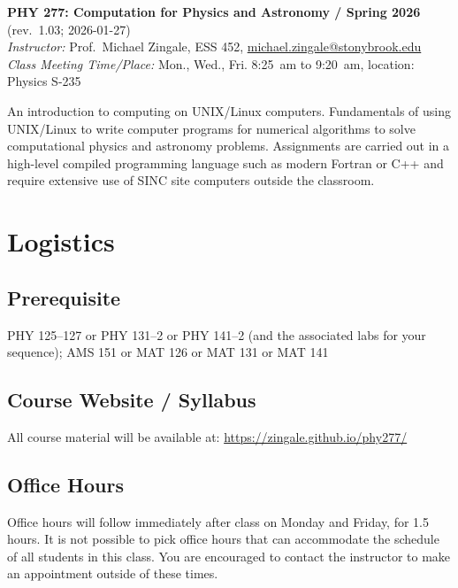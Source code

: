 \documentclass[10pt]{article}
\begin{document}
\begin{center}
{\large \sffamily \bfseries PHY 277: Computation for Physics and Astronomy / Spring 2026} {\footnotesize (rev.\ 1.03; 2026-01-27)}\\[1.5mm]
{\em Instructor:} Prof.\ Michael Zingale, ESS 452, \href{mailto:michael.zingale@stonybrook.edu}{michael.zingale@stonybrook.edu} \\
{\em Class Meeting Time/\/Place:} Mon., Wed., Fri. 8:25~am to 9:20~am, location: Physics S-235 \\
\end{center}


\begin{tcolorbox}
An introduction to computing on UNIX/Linux computers. Fundamentals of
using UNIX/Linux to write computer programs for numerical algorithms
to solve computational physics and astronomy problems. Assignments are
carried out in a high-level compiled programming language such as
modern Fortran or C++ and require extensive use of SINC site computers
outside the classroom.
\end{tcolorbox}

\section{Logistics}

\subsection{Prerequisite}
PHY 125--127 or PHY 131--2 or PHY 141--2 (and the associated labs for
your sequence); AMS 151 or MAT 126 or MAT 131 or MAT 141


\subsection{Course Website / Syllabus}

All course material will be available at:\newline
\url{https://zingale.github.io/phy277/}


\subsection{Office Hours}

Office hours will follow immediately after class on Monday and Friday,
for 1.5 hours.  It is not possible to pick office hours that can
accommodate the schedule of all students in this class.  You are
encouraged to contact the instructor to make an appointment outside of
these times.
\end{document}

